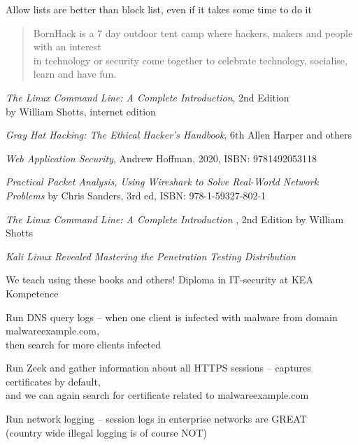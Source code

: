\documentclass[Screen16to9,17pt]{foils}
\begin{document}
Allow lists are better than block list, even if it takes some time to do it



\begin{quote}
BornHack is a 7 day outdoor tent camp where hackers, makers and people with an interest\\
in technology or security come together to celebrate technology, socialise, learn and have fun.
\end{quote}

\myquestionspage



\begin{list2}
\item \emph{The Linux Command Line: A Complete Introduction}, 2nd Edition\\
 by William Shotts, internet edition 

\item \emph{Gray Hat Hacking: The Ethical Hacker's Handbook}, 6th Allen Harper and others
\item \emph{Web Application Security}, Andrew Hoffman, 2020, ISBN: 9781492053118
\item \emph{Practical Packet Analysis, Using Wireshark to Solve Real-World Network Problems}
by Chris Sanders, 3rd ed, ISBN: 978-1-59327-802-1
\item \emph{The Linux Command Line: A Complete Introduction }, 2nd Edition
by William Shotts 
\item \emph{Kali Linux Revealed Mastering the Penetration Testing Distribution}\\
\end{list2}


We teach using these books and others! Diploma in IT-security at KEA Kompetence\\




\begin{list2}
\item Run DNS query logs -- when one client is infected with malware from domain malwareexample.com,\\
 then search for more clients infected
\item Run Zeek and gather information about all HTTPS sessions -- captures certificates by default,\\
and we can again search for certificate related to malwareexample.com
\item Run network logging -- session logs in enterprise networks are GREAT \\
(country wide illegal logging is of course NOT)
\end{list2}
\end{document}
